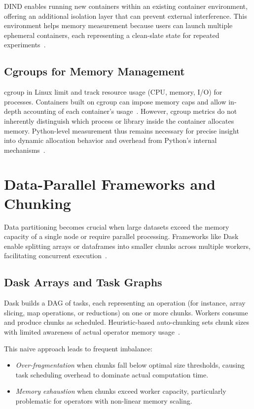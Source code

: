 \ac{DIND} enables running new containers within an existing container environment, offering an additional isolation layer that can prevent external interference.
This environment helps memory measurement because users can launch multiple ephemeral containers, each representing a clean-slate state for repeated experiments~\cite{Boettiger2015}.

\subsection{Cgroups for Memory Management}
\label{subsec:fundamentals-cgroups}

\ac{cgroup} in Linux limit and track resource usage (\ac{CPU}, memory, \ac{I/O}) for processes.
Containers built on \ac{cgroup} can impose memory caps and allow in-depth accounting of each container's usage~\cite{Kurtzer2017}.
However, \ac{cgroup} metrics do not inherently distinguish which process or library inside the container allocates memory.
Python-level measurement thus remains necessary for precise insight into dynamic allocation behavior and overhead from Python's internal mechanisms~\cite{Nanjekye2023}.


\section{Data-Parallel Frameworks and Chunking}
\label{sec:fundamentals-data-parallel}

Data partitioning becomes crucial when large datasets exceed the memory capacity of a single node or require parallel processing.
Frameworks like Dask enable splitting arrays or dataframes into smaller chunks across multiple workers, facilitating concurrent execution~\cite{rocklin2015dask,Dean2004}.

\subsection{Dask Arrays and Task Graphs}
\label{subsec:fundamentals-dask-overview}

Dask builds a \ac{DAG} of tasks, each representing an operation (for instance, array slicing, map operations, or reductions) on one or more chunks.
Workers consume and produce chunks as scheduled.
Heuristic-based auto-chunking sets chunk sizes with limited awareness of actual operator memory usage~\cite{rocklin2015dask}.

This naive approach leads to frequent imbalance:
\begin{itemize}
    \item \emph{Over-fragmentation} when chunks fall below optimal size thresholds, causing task scheduling overhead to dominate actual computation time.
    \item \emph{Memory exhaustion} when chunks exceed worker capacity, particularly problematic for operators with non-linear memory scaling.
\end{itemize}


